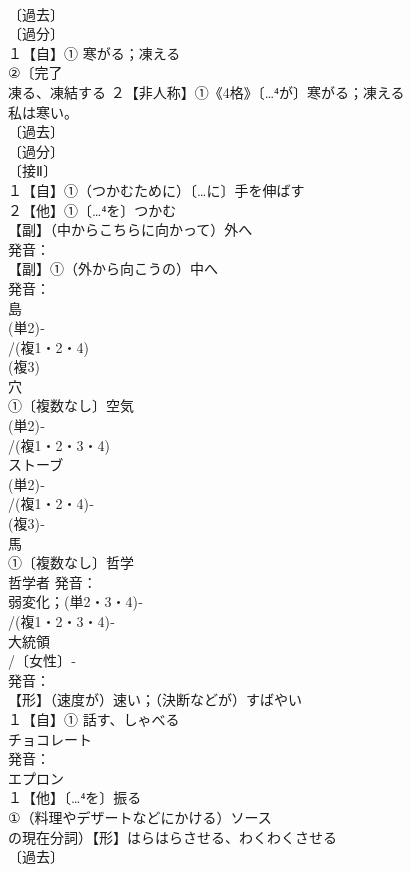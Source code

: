 \documentclass[8pt]{extreport}
\begin{document}
\begin{CJK}{UTF8}{min}
\\	〔過去〕
\\	〔過分〕
\\	１【自】① 寒がる；凍える 
\\	②〔完了
\\	凍る、凍結する ２【非人称】①《4格》〔…⁴が〕寒がる；凍える 
\\	私は寒い。
\\	〔過去〕
\\	〔過分〕
\\	〔接Ⅱ〕
\\	１【自】①（つかむために）〔…に〕手を伸ばす 
\\	２【他】①〔…⁴を〕つかむ
\\	【副】（中からこちらに向かって）外へ 
\\	発音：
\\	【副】①（外から向こうの）中へ 
\\	発音：
\\	島 
\\	(単2)‐
\\	/(複1・2・4)
\\	(複3)
\\	穴 
\\	①〔複数なし〕空気 
\\	(単2)‐
\\	/(複1・2・3・4)
\\	ストーブ 
\\	(単2)‐
\\	/(複1・2・4)‐
\\	(複3)‐
\\	馬
\\	①〔複数なし〕哲学 
\\	哲学者 発音：
\\	弱変化；(単2・3・4)‐
\\	/(複1・2・3・4)‐
\\	大統領 
\\	/〔女性〕‐
\\	発音：
\\	【形】（速度が）速い；（決断などが）すばやい
\\	１【自】① 話す、しゃべる 
\\	チョコレート 
\\	発音：
\\	エプロン 
\\	１【他】〔…⁴を〕振る 
\\	①（料理やデザートなどにかける）ソース 
\\	の現在分詞）【形】はらはらさせる、わくわくさせる 
\\	〔過去〕

\end{CJK}
\end{document}
